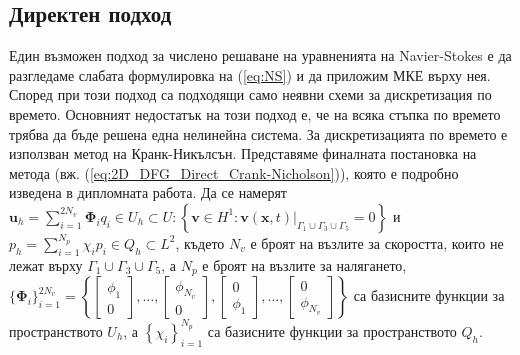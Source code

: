 \documentclass[12pt]{report}
\begin{document}
\subsection{Директен подход}
Един възможен подход за числено решаване на уравненията на Navier-Stokes е да разгледаме слабата формулировка на (\ref{eq:NS}) и да приложим МКЕ върху нея. Според \cite{gresho-fem} при този подход са подходящи само неявни схеми за дискретизация по времето. Основният недостатък на този подход е, че на всяка стъпка по времето трябва да бъде решена една нелинейна система. За дискретизацията по времето е използван метод на Кранк-Никълсън. Представяме финалната постановка на метода (вж. (\ref{eq:2D_DFG_Direct_Crank-Nicholson})), която е подробно изведена в дипломната работа. Да се намерят $\mathbf{u}_h = \sum\limits_{i=1}^{2N_v}{\mathbf{\Phi}_iq_i} \in U_h \subset U : \left\{\mathbf{v} \in H^1 : \mathbf{v}(\mathbf{x}, t)|_{\Gamma_1 \cup \Gamma_3 \cup \Gamma_5} = 0\right\}$  и $p_h = \sum\limits_{i=1}^{N_p}{\chi_ip_i} \in Q_h \subset L^2$, където $N_v$ е броят на възлите за скоростта, които не лежат върху $\Gamma_1 \cup \Gamma_3 \cup \Gamma_5$, а $N_p$ е броят на възлите за налягането, $  \{\mathbf{\Phi}_i\}^{2N_v}_{i=1} = \left\{
  \begin{bmatrix} \phi_1 \\ 0\end{bmatrix}
  , \dots ,
  \begin{bmatrix} \phi_{N_v} \\ 0\end{bmatrix}
  ,
  \begin{bmatrix} 0 \\ \phi_1\end{bmatrix}
  , \dots ,
  \begin{bmatrix} 0 \\ \phi_{N_v}\end{bmatrix}
  \right\}$ са базисните функции за пространството $U_h$, а $\left\{\chi_i\right\}^{N_p}_{i = 1}$ са базисните функции за пространството $Q_h$.
\end{document}
